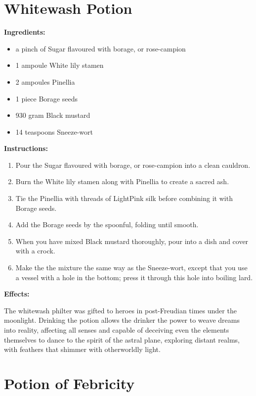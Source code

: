 \documentclass{article}
\begin{document}
\newpage
\section*{Whitewash Potion}

\textbf{Ingredients:}

\begin{itemize}
  \item a pinch of Sugar flavoured with borage, or rose-campion
  \item 1 ampoule White lily stamen
  \item 2 ampoules Pinellia
  \item 1 piece Borage seeds
  \item 930 gram Black mustard
  \item 14 teaspoons Sneeze-wort
\end{itemize}

\textbf{Instructions:}

\begin{enumerate}
  \item Pour the Sugar flavoured with borage, or rose-campion into a clean cauldron.
  \item Burn the White lily stamen along with Pinellia to create a sacred ash.
  \item Tie the Pinellia with threads of LightPink silk before combining it with Borage seeds.
  \item Add the Borage seeds by the spoonful, folding until smooth.
  \item When you have mixed Black mustard thoroughly, pour into a dish and cover with a crock.
  \item Make the the mixture the same way as the Sneeze-wort, except that you use a vessel with a hole in the bottom; press it through this hole into boiling lard.
\end{enumerate}

\textbf{Effects:}

The whitewash philter was gifted to heroes in post-Freudian times under the moonlight. Drinking the potion allows the drinker the power to weave dreams into reality, affecting all senses and capable of deceiving even the elements themselves to dance to the spirit of the astral plane, exploring distant realms, with feathers that shimmer with otherworldly light.

\newpage
\section*{Potion of Febricity}
\end{document}
